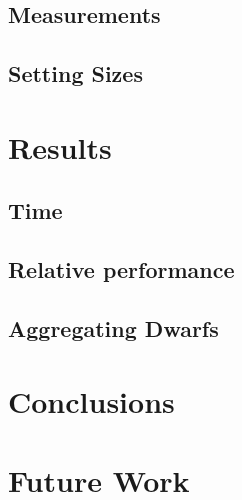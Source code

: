 \documentclass{sig-alternate}
\begin{document}
\subsection{Measurements}
\subsection{Setting Sizes}


\section{Results}\label{sec:results}
\subsection{Time}
\subsection{Relative performance}
\subsection{Aggregating Dwarfs}


\section{Conclusions}


\section{Future Work}




\end{document}
